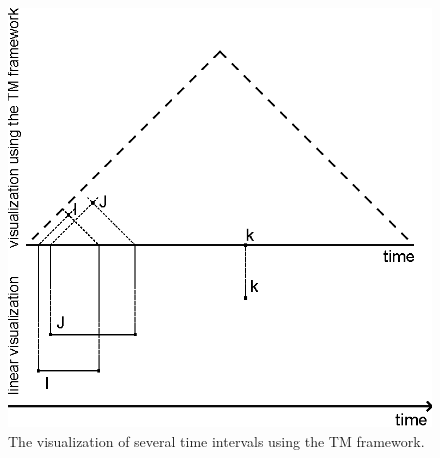 \begin{figure}[h]
	\centering
	\includegraphics[width=0.8\columnwidth]{graphs/TM_model_several.eps}
	\caption{The visualization of several time intervals using the TM framework.}
	\label{fig:tm-const-ex}
\end{figure}





